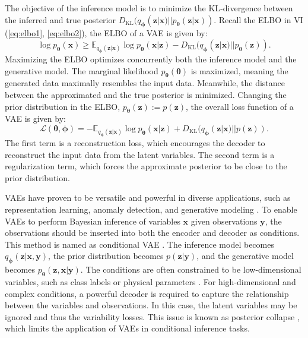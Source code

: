 The objective of the inference model is to minimize the \ac{KL}-divergence between the inferred and true posterior $D_{\text{KL}}(q_{\boldsymbol{\phi}}(\boldsymbol{z}|\boldsymbol{x})||p_{\boldsymbol{\theta}}(\boldsymbol{z}|\boldsymbol{x}))$. Recall the \ac{ELBO} in \ac{VI} (\ref{eq:elbo1}, \ref{eq:elbo2}), the \ac{ELBO} of a \ac{VAE} is given by:
\begin{equation}
    \log p_{\boldsymbol{\theta}}(\boldsymbol{x}) \geq \mathbb{E}_{q_{\boldsymbol{\phi}}(\boldsymbol{z}|\boldsymbol{x})}\log p_{\boldsymbol{\theta}}(\boldsymbol{x}|\boldsymbol{z}) - D_{\text{KL}}(q_{\boldsymbol{\phi}}(\boldsymbol{z}|\boldsymbol{x})||p_{\boldsymbol{\theta}}(\boldsymbol{z})).
\end{equation}
Maximizing the \ac{ELBO} optimizes concurrently both the inference model and the generative model. The marginal likelihood $p_{\boldsymbol{\theta}}(\boldsymbol{\theta})$ is maximized, meaning the generated data maximally resembles the input data. Meanwhile, the distance between the approximated and the true posterior is minimized. 
Changing the prior distribution in the \ac{ELBO}, $p_{\boldsymbol{\theta}}(\boldsymbol{z}):=p(\boldsymbol{z})$, the overall loss function of a \ac{VAE} is given by:
\begin{equation}
    \mathcal{L}(\boldsymbol{\theta}, \boldsymbol{\phi}) = -\mathbb{E}_{q_{\boldsymbol{\phi}}(\boldsymbol{z}|\boldsymbol{x})}\log p_{\boldsymbol{\theta}}(\boldsymbol{x}|\boldsymbol{z}) + D_{\text{KL}}(q_{\boldsymbol{\phi}}(\boldsymbol{z}|\boldsymbol{x})||p(\boldsymbol{z})).
\end{equation}
The first term is a reconstruction loss, which encourages the decoder to reconstruct the input data from the latent variables. The second term is a regularization term, which forces the approximate posterior to be close to the prior distribution.

\acp{VAE} have proven to be versatile and powerful in diverse applications, such as representation learning, anomaly detection, and generative modeling \citep{Mienye2025}. To enable \acp{VAE} to perform Bayesian inference of variables $\boldsymbol{x}$ given observations $\boldsymbol{y}$, the observations should be inserted into both the encoder and decoder as conditions. This method is named as conditional \ac{VAE} \citep{sohn2015cvae}. The inference model becomes $q_{\boldsymbol{\phi}}(\boldsymbol{z}|\boldsymbol{x}, \boldsymbol{y})$, the prior distribution becomes $p(\boldsymbol{z}|\boldsymbol{y})$, and the generative model becomes $p_{\boldsymbol{\theta}}(\boldsymbol{z}, \boldsymbol{x}|\boldsymbol{y})$. The conditions are often constrained to be low-dimensional variables, such as class labels \citep{sohn2015cvae} or physical parameters \citep{martínezpalomera2020pelsvae}. For high-dimensional and complex conditions, a powerful decoder is required to capture the relationship between the variables and observations. In this case, the latent variables may be ignored and thus the variability losses. This issue is known as posterior collapse \citep{bowman2016cvae, mccarthy2020cvae}, which limits the application of \acp{VAE} in conditional inference tasks.

